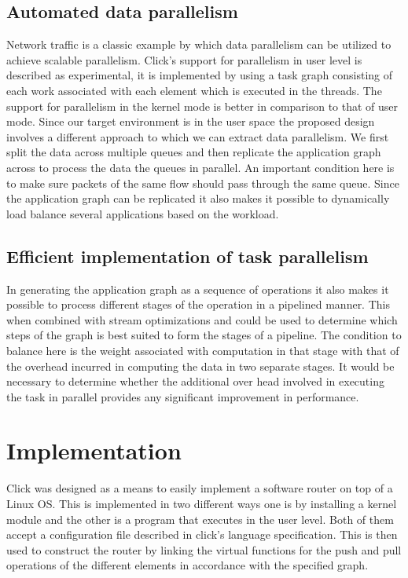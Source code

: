\documentclass[conference]{IEEEtran}
\begin{document}
\subsection{Automated data parallelism}

Network traffic is a classic example by which data parallelism can be utilized to achieve scalable parallelism. Click's support for parallelism in user level is described as experimental, it is implemented by using a task graph consisting of each work associated with each element which is executed in the threads. The support for parallelism in the kernel mode is better in comparison to that of user mode. Since our target environment is in the user space the proposed design involves a different approach to which we can extract data parallelism. We first split the data across multiple queues and then replicate the application graph across to process the data the queues in parallel. An important condition here is to make sure packets of the same flow should pass through the same queue. Since the application graph can be replicated it also makes it possible to dynamically load balance several applications based on the workload.   

\subsection{Efficient implementation of task parallelism}

In generating the application graph as a sequence of operations it also makes it possible to process different stages of the operation in a pipelined manner. This when combined with stream optimizations and could be used to determine which steps of the graph is best suited to form the stages of a pipeline. The condition to balance here is the weight associated with computation in that stage with that of the overhead incurred in computing the data in two separate stages. It would be necessary to determine whether the additional over head involved in executing the task in parallel provides any significant improvement in performance. 

\section{Implementation}

Click was designed as a means to easily implement a software router on top of a Linux OS. This is implemented in two different ways one is by installing a kernel module and the other is a program that executes in the user level. Both of them accept a configuration file described in click's language specification. This is then used to construct the router by linking the virtual functions for the push and pull operations of the different elements in accordance with the specified graph.
\end{document}
